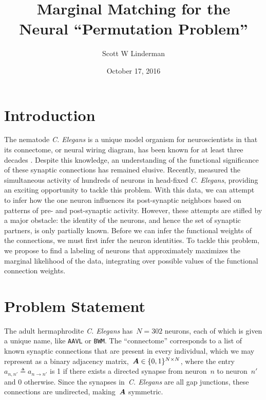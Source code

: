 



\title{Marginal Matching for the \\ Neural ``Permutation Problem''}
\author{Scott W Linderman}
\date{October 17, 2016}


\maketitle

\section{Introduction}
\label{sec:introduction}

The nematode \textit{C. Elegans} is a unique model organism for
neuroscientists in that its connectome, or neural wiring diagram,
has been known for at least three decades \citep{white1986structure}.
Despite this knowledge, an understanding of the functional significance
of these synaptic connections has remained elusive.
Recently, \citet{kato2015global} measured the simultaneous activity of hundreds of
neurons in head-fixed \textit{C. Elegans}, providing an exciting
opportunity to tackle this problem.  With this data, we can attempt to infer
how the one neuron influences its post-synaptic neighbors
based on patterns of pre- and post-synaptic activity. However,
these attempts are stifled by a major obstacle: the identity of the
neurons, and hence the set of synaptic partners, is only partially
known. Before we can infer the functional weights of the connections,
we must first infer the neuron identities. To tackle this problem,
we propose to find a labeling of neurons that approximately
maximizes the marginal likelihood of the data, integrating over possible
values of the functional connection weights. 

\section{Problem Statement}
The adult hermaphrodite \textit{C. Elegans} has~${N=302}$ neurons, each of
which is given a unique name, like \texttt{AAVL} or \texttt{BWM}.
The ``connectome'' corresponds to a list of known synaptic connections
that are present in every individual, which we may represent as a
binary adjacency matrix,~${\boldsymbol{A} \in \{0,1\}^{N \times N}}$,
where the entry~$a_{n,n'} \triangleq a_{n \to n'}$ is 1 if there exists a directed
synapse from neuron~$n$ to neuron~$n'$ and 0 otherwise. Since the
synapses in~\textit{C. Elegans} are all gap junctions, these
connections are undirected, making~$\boldsymbol{A}$ symmetric. 

